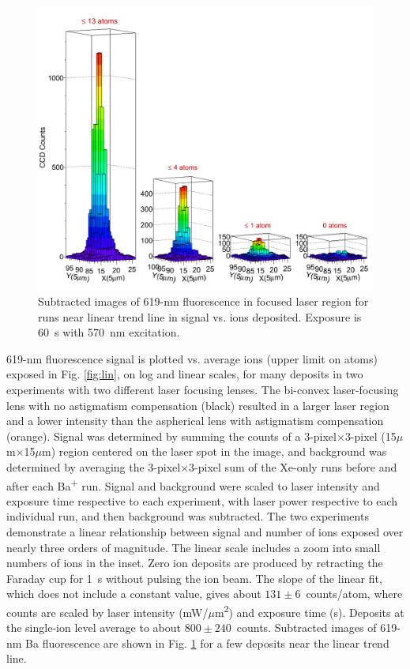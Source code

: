 \begin{figure} %
        \centering
                \includegraphics[width=.99\textwidth]{figures/train.png}
                \caption{Subtracted images of 619-nm fluorescence in focused laser region for runs near linear trend line in signal vs. ions deposited.  Exposure is 60~s with 570~nm excitation.}
\label{fig:train}
\end{figure}

619-nm fluorescence signal is plotted vs. average ions (upper limit on atoms) exposed in Fig. \ref{fig:lin}, on log and linear scales, for many deposits in two experiments with two different laser focusing lenses.  The bi-convex laser-focusing lens with no astigmatism compensation (black) resulted in a larger laser region and a lower intensity than the aspherical lens with astigmatism compensation (orange).  Signal was determined by summing the counts of a 3-pixel$\times$3-pixel (15$\mu$m$\times$15$\mu$m) region centered on the laser spot in the image, and background was determined by averaging the 3-pixel$\times$3-pixel sum of the Xe-only runs before and after each Ba\textsuperscript{+} run.  Signal and background were scaled to laser intensity and exposure time respective to each experiment, with laser power respective to each individual run, and then background was subtracted.  The two experiments demonstrate a linear relationship between signal and number of ions exposed over nearly three orders of magnitude.  The linear scale includes a zoom into small numbers of ions in the inset.  Zero ion deposits are produced by retracting the Faraday cup for 1~s without pulsing the ion beam.  The slope of the linear fit, which does not include a constant value, gives about $131 \pm 6$~counts/atom, where counts are scaled by laser intensity (mW/$\mu$m\textsuperscript{2}) and exposure time (s).  Deposits at the single-ion level average to about $800 \pm 240$~counts.  Subtracted images of 619-nm Ba fluorescence are shown in Fig. \ref{fig:train} for a few deposits near the linear trend line. %

